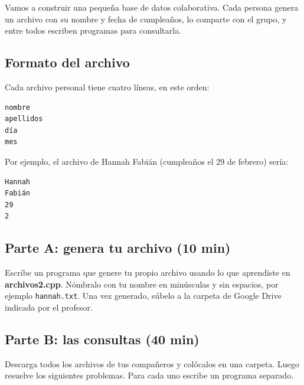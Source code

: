 \documentclass[12pt, oneside]{article}
\begin{document}
Vamos a construir una pequeña base de datos colaborativa.  Cada persona
genera un archivo con su nombre y fecha de cumpleaños, lo comparte con el
grupo, y entre todos escriben programas para consultarla.

\subsection{Formato del archivo}

Cada archivo personal tiene cuatro líneas, en este orden:

\begin{verbatim}
nombre
apellidos
día
mes
\end{verbatim}

Por ejemplo, el archivo de Hannah Fabián (cumpleaños el 29 de febrero)
sería:

\begin{verbatim}
Hannah
Fabián
29
2
\end{verbatim}

\subsection{Parte A: genera tu archivo (10 min)}

Escribe un programa que genere tu propio archivo usando lo que aprendiste
en \textbf{archivos2.cpp}.  Nómbralo con tu nombre en minúsculas y sin
espacios, por ejemplo \texttt{hannah.txt}.  Una vez generado, súbelo a la
carpeta de Google Drive indicada por el profesor.

\subsection{Parte B: las consultas (40 min)}

Descarga todos los archivos de tus compañeros y colócalos en una carpeta.
Luego resuelve los siguientes problemas.  Para cada uno escribe un programa
separado.
\end{document}
